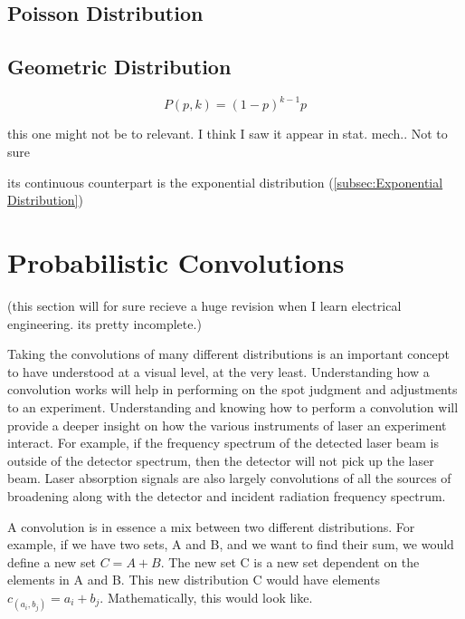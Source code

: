 \documentclass[11pt,a4paper]{book}
\begin{document}
	\subsection{Poisson Distribution}	
	\label{subsec:Poisson Distribution}
	
	\subsection{Geometric Distribution}	
	\label{subsec:Geometric Distribution}
	\begin{equation}
	P(p,k)=(1-p)^{k-1}p
	\end{equation}
	
	this one might not be to relevant. I think I saw it appear in stat. mech.. Not to sure
	
	its continuous counterpart is the exponential distribution (\autoref{subsec:Exponential Distribution})			
	\section{Probabilistic Convolutions}
		\label{subsec:convolution}
		(this section will for sure recieve a huge revision when I learn electrical engineering. its pretty incomplete.)
		
		Taking the  convolutions of many different distributions is an important concept to have understood at a visual level, at the very least. Understanding how a convolution works will help in performing on the spot judgment and adjustments to an experiment. Understanding and knowing how to perform a convolution will provide a deeper insight on how the various instruments of laser an experiment interact. For example, if the frequency spectrum of the detected laser beam is outside of the detector spectrum, then the detector will not pick up the laser beam. Laser absorption signals are also largely convolutions of all the sources of broadening along with the detector and incident radiation frequency spectrum.
		
		A convolution is in essence a mix between two different distributions. For example, if we have two sets, A and B, and we want to find their sum, we would define a new set $C = A + B$. The new set C is a new set dependent on the elements in A and B. This new distribution C would have elements $c_{(a_i,b_j)} = a_i + b_j$. Mathematically, this would look like.
		
\end{document}
